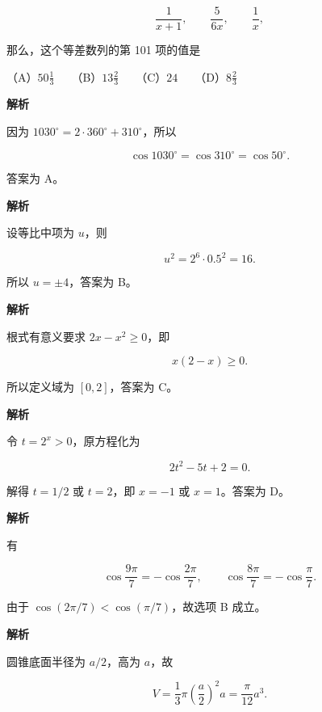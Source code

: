 \begin{answer}
\nopagebreak[4]
\[
\frac1{x+1},\qquad \frac5{6x},\qquad \frac1x,
\]

那么，这个等差数列的第 101 项的值是

（A）$50\frac13$　　（B）$13\frac23$　　（C）$24$　　（D）$8\frac23$

\textbf{解析}


因为 $1030^\circ=2\cdot360^\circ+310^\circ$，所以

\nopagebreak[4]
\[
\cos1030^\circ=\cos310^\circ=\cos50^\circ.
\]

答案为 A。


\textbf{解析}

设等比中项为 $u$，则

\nopagebreak[4]
\[
u^2=2^6\cdot0.5^2=16.
\]

所以 $u=\pm4$，答案为 B。


\textbf{解析}

根式有意义要求 $2x-x^2\ge0$，即

\nopagebreak[4]
\[
x(2-x)\ge0.
\]

所以定义域为 $[0,2]$，答案为 C。


\textbf{解析}

令 $t=2^x>0$，原方程化为

\nopagebreak[4]
\[
2t^2-5t+2=0.
\]

解得 $t=1/2$ 或 $t=2$，即 $x=-1$ 或 $x=1$。答案为 D。


\textbf{解析}

有

\nopagebreak[4]
\[
\cos\frac{9\pi}{7}=-\cos\frac{2\pi}{7},
\qquad
\cos\frac{8\pi}{7}=-\cos\frac{\pi}{7}.
\]

由于 $\cos(2\pi/7)<\cos(\pi/7)$，故选项 B 成立。


\textbf{解析}

圆锥底面半径为 $a/2$，高为 $a$，故

\nopagebreak[4]
\[
V=\frac13\pi\left(\frac a2\right)^2a=\frac\pi{12}a^3.
\]


\end{answer}
